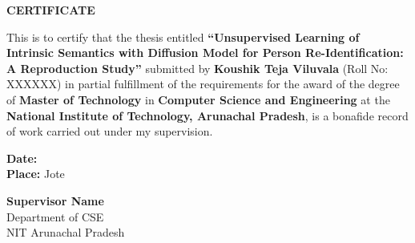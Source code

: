 \begin{center}
\textbf{\Large CERTIFICATE}
\end{center}
\vspace{1cm}

This is to certify that the thesis entitled \textbf{``Unsupervised Learning of Intrinsic Semantics with Diffusion Model for Person Re-Identification: A Reproduction Study''} submitted by \textbf{Koushik Teja Viluvala} (Roll No: XXXXXX) in partial fulfillment of the requirements for the award of the degree of \textbf{Master of Technology} in \textbf{Computer Science and Engineering} at the \textbf{National Institute of Technology, Arunachal Pradesh}, is a bonafide record of work carried out under my supervision.

\vspace{3cm}

\noindent
\begin{minipage}{0.45\textwidth}
\textbf{Date:}\\
\textbf{Place:} Jote
\end{minipage}
\hfill
\begin{minipage}{0.45\textwidth}
\raggedleft
\textbf{Supervisor Name}\\
Department of CSE\\
NIT Arunachal Pradesh
\end{minipage}

